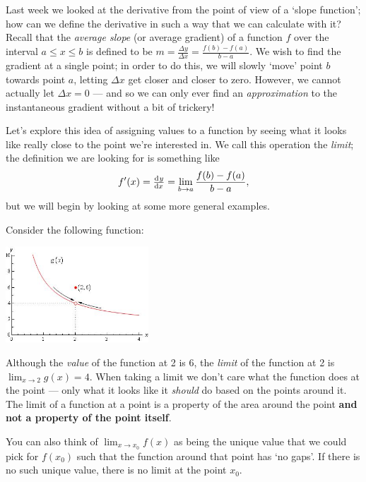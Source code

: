 



Last week we looked at the derivative from the point of view of a `slope function'; how can we define the derivative in such a way that we can
calculate with it? Recall that the \textit{average slope} (or average gradient) of a function $ f $ over the interval $ a \leq x \leq b $ is defined
to be $ m = \frac{\Delta y}{\Delta x} = \frac{f(b) - f(a)}{b - a} $. We wish to find the gradient at a single point; in order to do this, we will
slowly `move' point $ b $ towards point $ a $, letting $ \Delta x $ get closer and closer to zero. However, we cannot actually let $ \Delta x = 0 $ --- and
so we can only ever find an \textit{approximation} to the instantaneous gradient without a bit of trickery!

Let's explore this idea of assigning values to a function by seeing what it looks like really close to the point we're interested in. We call this
operation the \textit{limit}; the definition we are looking for is something like
\begin{displaymath}
  f'(x) = \od{y}{x} = \lim_{b \to a} \frac{f(b) - f(a)}{b - a},
\end{displaymath}
but we will begin by looking at some more general examples.

Consider the following function:
\begin{center}
  \includegraphics[width=0.4\textwidth]{oslimit2}
\end{center}
Although the \textit{value} of the function at 2 is 6, the \textit{limit} of the function at 2 is $ \lim_{x \to 2} g(x) = 4 $. When taking a limit we
don't care what the function does at the point --- only what it looks like it \emph{should} do based on the points around it. The limit of a function
at a point is a property of the area around the point \textbf{and not a property of the point itself}.

You can also think of $ \lim_{x \to x_0} f(x) $ as being the unique value that we could pick for $ f(x_0) $ such that the function
around that point has `no gaps'. If there is no such unique value, there is no limit at the point $ x_0 $.


